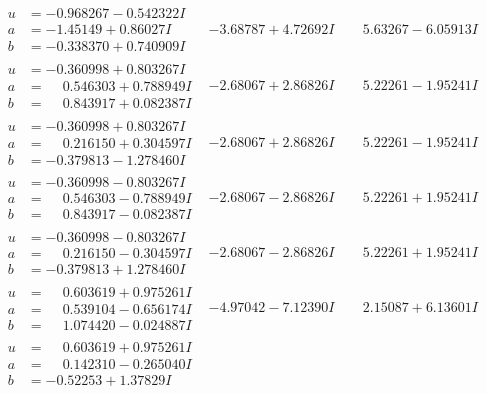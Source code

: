 \documentclass[1p]{elsarticle_modified}
\theoremstyle{definition}
\begin{document}
$$\begin{array}{c|c|c}
\begin{aligned}
u &= -0.968267 - 0.542322 I \\
a &= -1.45149 + 0.86027 I \\
b &= -0.338370 + 0.740909 I\end{aligned}
 & -3.68787 + 4.72692 I & \phantom{-}5.63267 - 6.05913 I \\ \hline\begin{aligned}
u &= -0.360998 + 0.803267 I \\
a &= \phantom{-}0.546303 + 0.788949 I \\
b &= \phantom{-}0.843917 + 0.082387 I\end{aligned}
 & -2.68067 + 2.86826 I & \phantom{-}5.22261 - 1.95241 I \\ \hline\begin{aligned}
u &= -0.360998 + 0.803267 I \\
a &= \phantom{-}0.216150 + 0.304597 I \\
b &= -0.379813 - 1.278460 I\end{aligned}
 & -2.68067 + 2.86826 I & \phantom{-}5.22261 - 1.95241 I \\ \hline\begin{aligned}
u &= -0.360998 - 0.803267 I \\
a &= \phantom{-}0.546303 - 0.788949 I \\
b &= \phantom{-}0.843917 - 0.082387 I\end{aligned}
 & -2.68067 - 2.86826 I & \phantom{-}5.22261 + 1.95241 I \\ \hline\begin{aligned}
u &= -0.360998 - 0.803267 I \\
a &= \phantom{-}0.216150 - 0.304597 I \\
b &= -0.379813 + 1.278460 I\end{aligned}
 & -2.68067 - 2.86826 I & \phantom{-}5.22261 + 1.95241 I \\ \hline\begin{aligned}
u &= \phantom{-}0.603619 + 0.975261 I \\
a &= \phantom{-}0.539104 - 0.656174 I \\
b &= \phantom{-}1.074420 - 0.024887 I\end{aligned}
 & -4.97042 - 7.12390 I & \phantom{-}2.15087 + 6.13601 I \\ \hline\begin{aligned}
u &= \phantom{-}0.603619 + 0.975261 I \\
a &= \phantom{-}0.142310 - 0.265040 I \\
b &= -0.52253 + 1.37829 I\end{aligned}

\end{array}$$
\end{document}
